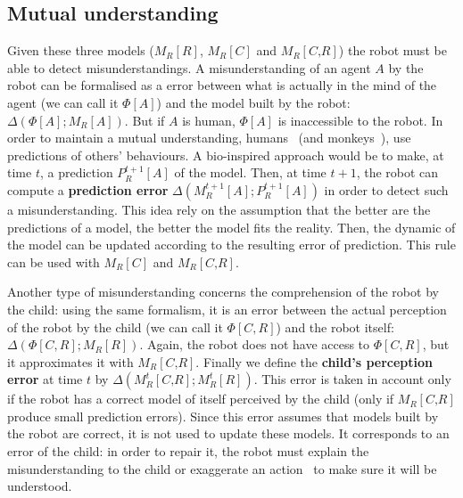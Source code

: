 \documentclass[10pt,a4paper]{article}
\begin{document}
\subsection{Mutual understanding}\label{mu}
Given these three models ($ M_R\left[\textit{R}\right]$, $ M_R\left[\textit{C}\right]$ and $ M_R\left[\textit{C,R}\right]$) the robot must be able to detect misunderstandings. 
A misunderstanding of an agent $A$ by the robot can be formalised as a error between what is actually in the mind of the agent (we can call it $\Phi[A]$) and the model built by the robot: $\Delta \left(\Phi[A] ; M_R\left[\textit{A}\right]\right)$. But if $A$ is human, $\Phi[A]$ is inaccessible to the robot. In order to maintain a mutual understanding, humans~\cite{suzuki2015neural} (and monkeys~\cite{haroush2015neuronal}), use predictions of others' behaviours. A bio-inspired approach would be to make, at time $t$, a prediction $P^{t+1}_R\left[\textit{A}\right]$ of the model. Then, at time $t+1$, the robot can compute a \textbf{prediction error} $\Delta \left( M^{t+1}_R\left[\textit{A}\right]; P^{t+1}_R\left[\textit{A}\right]\right)$ in order to detect such a misunderstanding. This idea rely on the assumption that the better are the predictions of a model, the better the model fits the reality. Then, the dynamic of the model can be updated according to the resulting error of prediction. This rule can be used with $ M_R\left[\textit{C}\right]$ and $ M_R\left[\textit{C,R}\right]$. 

Another type of misunderstanding concerns the comprehension of the robot by the child: using the same formalism, it is an error between the actual perception of the robot by the child (we can call it $\Phi[C,R]$) and the robot itself: $\Delta \left(\Phi[C,R] ; M_R\left[\textit{R}\right]\right)$. Again, the robot does not have access to $\Phi[C,R]$, but it approximates it with $ M_R\left[\textit{C,R}\right]$. Finally we define the \textbf{child's perception error} at time $t$ by $\Delta \left(M^t_R\left[\textit{C,R}\right] ; M^t_R\left[\textit{R}\right]\right)$. This error is taken in account only if the robot has a correct model of itself perceived by the child (only if $M_R\left[\textit{C,R}\right]$ produce small prediction errors). Since this error assumes that models built by the robot are correct, it is not used to update these models. It corresponds to an error of the child: in order to repair it, the robot must explain the misunderstanding to the child or exaggerate an action~\cite{niko2016viewpoint} to make sure it will be understood.
\end{document}
